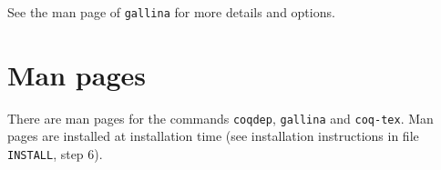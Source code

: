 See the man page of {\tt gallina} for more details and options.


\section[Man pages]{Man pages\label{ManPages}}

There are man pages for the commands {\tt coqdep}, {\tt gallina} and
{\tt coq-tex}. Man pages are installed at installation time
(see installation instructions in file {\tt INSTALL}, step 6).



